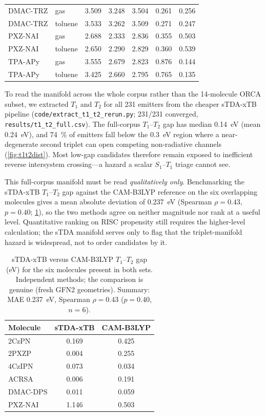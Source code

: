 \documentclass[final,3p,times,twocolumn]{elsarticle}
\begin{document}
\begin{table}[htbp]
\begin{tabular}{llccccc}
    DMAC-TRZ & gas & 3.509 & 3.248 & 3.504 & 0.261 & 0.256 \\
    DMAC-TRZ & toluene & 3.533 & 3.262 & 3.509 & 0.271 & 0.247 \\
    PXZ-NAI & gas & 2.688 & 2.333 & 2.836 & 0.355 & 0.503 \\
    PXZ-NAI & toluene & 2.650 & 2.290 & 2.829 & 0.360 & 0.539 \\
    TPA-APy & gas & 3.555 & 2.679 & 2.823 & 0.876 & 0.144 \\
    TPA-APy & toluene & 3.425 & 2.660 & 2.795 & 0.765 & 0.135 \\
    \bottomrule
  \end{tabular}
\end{table}

To read the manifold across the whole corpus rather than the \num{14}-molecule ORCA
subset, we extracted $T_1$ and $T_2$ for all \num{231} emitters from the cheaper
sTDA-xTB pipeline (\texttt{code/extract\_t1\_t2\_rerun.py}; \num{231}/\num{231}
converged, \texttt{results/t1\_t2\_full.csv}). The full-corpus $T_1$--$T_2$ gap has median
\qty{0.14}{\electronvolt} (mean \qty{0.24}{\electronvolt}), and \qty{74}{\percent} of
emitters fall below the \qty{0.3}{\electronvolt} region where a near-degenerate second
triplet can open competing non-radiative channels (\cref{fig:t1t2dist}). Most
low-gap candidates therefore remain exposed to inefficient reverse intersystem
crossing---a hazard a scalar $S_1$--$T_1$ triage cannot see.

This full-corpus manifold must be read \emph{qualitatively only}. Benchmarking the
sTDA-xTB $T_1$--$T_2$ gap against the CAM-B3LYP reference on the six overlapping
molecules gives a mean absolute deviation of \qty{0.237}{\electronvolt}
(Spearman $\rho = 0.43$, $p = 0.40$; \cref{tab:manifold_val}), so the two methods agree
on neither magnitude nor rank at a useful level. Quantitative ranking on RISC propensity
still requires the higher-level calculation; the sTDA manifold serves only to flag that
the triplet-manifold hazard is widespread, not to order candidates by it.

\begin{table}[htbp]
  \centering
  \caption{sTDA-xTB versus CAM-B3LYP $T_1$--$T_2$ gap (eV) for the six molecules present
    in both sets. Independent methods; the comparison is genuine (fresh GFN2 geometries).
    Summary: MAE \qty{0.237}{\electronvolt}, Spearman $\rho = 0.43$ ($p = 0.40$, $n = 6$).}
  \label{tab:manifold_val}
  \small
  \begin{tabular}{lcc}
    \toprule
    Molecule & sTDA-xTB & CAM-B3LYP \\
    \midrule
    2CzPN    & 0.169 & 0.425 \\
    2PXZP    & 0.004 & 0.255 \\
    4CzIPN   & 0.073 & 0.034 \\
    ACRSA    & 0.006 & 0.191 \\
    DMAC-DPS & 0.011 & 0.059 \\
    PXZ-NAI  & 1.146 & 0.503 \\
    \bottomrule
  \end{tabular}
\end{table}
\end{document}
